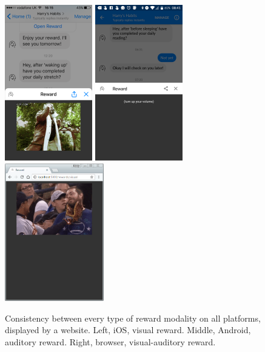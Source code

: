 \begin{figure}[H]
  \centering
  \includegraphics[width=1.5in]{../resources/design/reward-visual-2.png}
  \hspace{10px}
  \includegraphics[width=1.5in]{../resources/design/reward-audio.png}
  \hspace{10px}
  \includegraphics[width=1.7in]{../resources/design/reward-desktop-visual.png}
  \caption{Consistency between every type of reward modality on all platforms, displayed by a website. Left, iOS, visual reward. Middle, Android, auditory reward. Right, browser, visual-auditory reward.}
  \label{fig:rewards_consistency}
\end{figure}

